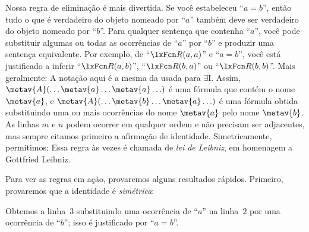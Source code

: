Nossa regra de eliminação é mais divertida. Se você estabeleceu \textquotedblleft $a=b$\textquotedblright{}, então tudo o que é verdadeiro do objeto nomeado por \textquotedblleft $a$\textquotedblright{} também deve ser verdadeiro do objeto nomeado por \textquotedblleft $b$\textquotedblright{}. Para qualquer sentença que contenha \textquotedblleft $a$\textquotedblright{}, você pode substituir algumas ou todas as ocorrências de \textquotedblleft $a$\textquotedblright{} por \textquotedblleft $b$\textquotedblright{} e produzir uma sentença equivalente. Por exemplo, de \textquotedblleft $\atom{R}{a,a}$\textquotedblright{} e \textquotedblleft $a=b$\textquotedblright{}, você está justificado a inferir \textquotedblleft $\atom{R}{a,b}$\textquotedblright{}, \textquotedblleft $\atom{R}{b,a}$\textquotedblright{} ou \textquotedblleft $\atom{R}{b,b}$\textquotedblright{}. Mais geralmente:
A notação aqui é a mesma da usada para $\exists$I. Assim, $\metav{A}(\ldots \metav{a} \ldots \metav{a}\ldots)$ é uma fórmula que contém o nome $\metav{a}$, e $\metav{A}(\ldots \metav{b} \ldots \metav{a}\ldots)$ é uma fórmula obtida substituindo uma ou mais ocorrências do nome $\metav{a}$ pelo nome $\metav{b}$. As linhas $m$ e $n$ podem ocorrer em qualquer ordem e não precisam ser adjacentes, mas sempre citamos primeiro a afirmação de identidade. Simetricamente, permitimos:
Essa regra às vezes é chamada de \emph{lei de Leibniz}, em homenagem a Gottfried Leibniz.

Para ver as regras em ação, provaremos alguns resultados rápidos. Primeiro, provaremos que a identidade é \emph{simétrica}:
\begin{fitchproof}
	\open
		\AS
	\close
\end{fitchproof}
Obtemos a linha~$3$ substituindo uma ocorrência de \textquotedblleft $a$\textquotedblright{} na linha~$2$ por uma ocorrência de \textquotedblleft $b$\textquotedblright{}; isso é justificado por \textquotedblleft $a=b$\textquotedblright{}.

